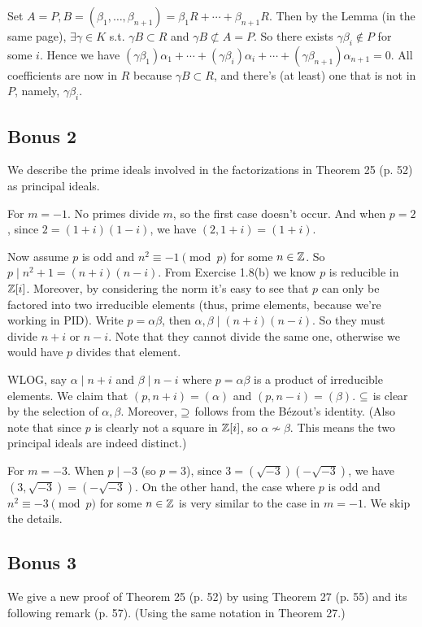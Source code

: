 \documentclass[../Marcus.tex]{subfiles}
\begin{document}
Set $A=P,B=(\beta_1,\ldots,\beta_{n+1})=\beta_1R+\cdots+\beta_{n+1}R$. Then by the Lemma (in the same page), $\exists \gamma\in K$ s.t. $\gamma B\subset R$ and $\gamma B\not\subset A=P$. So there exists $\gamma\beta_i\notin P$ for some $i$. Hence we have $(\gamma\beta_1)\alpha_1+\cdots+(\gamma\beta_i)\alpha_i+\cdots+(\gamma\beta_{n+1})\alpha_{n+1}=0$. All coefficients are now in $R$ because $\gamma B\subset R$, and there's (at least) one that is not in $P$, namely, $\gamma\beta_i$.

\subsection*{Bonus 2}

We describe the prime ideals involved in the factorizations in Theorem 25 (p. 52) as principal ideals.

For $m=-1$. No primes divide $m$, so the first case doesn't occur. And when $p=2$, since $2=(1+i)(1-i)$, we have $(2,1+i)=(1+i)$.

Now assume $p$ is odd and $n^2\equiv -1 \pmod{p}$ for some $n\in\mathbb{Z}$. So $p\mid n^2+1=(n+i)(n-i)$. From Exercise 1.8(b) we know $p$ is reducible in $\mathbb{Z}[i]$. Moreover, by considering the norm it's easy to see that $p$ can only be factored into two irreducible elements (thus, prime elements, because we're working in PID). Write $p=\alpha\beta$, then $\alpha,\beta\mid(n+i)(n-i)$. So they must divide $n+i$ or $n-i$. Note that they cannot divide the same one, otherwise we would have $p$ divides that element.

WLOG, say $\alpha\mid n+i$ and $\beta\mid n-i$ where $p=\alpha\beta$ is a product of irreducible elements. We claim that $(p,n+i)=(\alpha)$ and $(p,n-i)=(\beta)$. $\subseteq$ is clear by the selection of $\alpha,\beta$. Moreover, $\supseteq$ follows from the Bézout's identity. (Also note that since $p$ is clearly not a square in $\mathbb{Z}[i]$, so $\alpha\nsim\beta$. This means the two principal ideals are indeed distinct.)

For $m=-3$. When $p\mid -3$ (so $p=3$), since $3=(\sqrt{-3})(-\sqrt{-3})$, we have $(3,\sqrt{-3})=(-\sqrt{-3})$. On the other hand, the case where $p$ is odd and $n^2\equiv -3 \pmod{p}$ for some $n\in\mathbb{Z}$ is very similar to the case in $m=-1$. We skip the details.

\subsection*{Bonus 3}

We give a new proof of Theorem 25 (p. 52) by using Theorem 27 (p. 55) and its following remark (p. 57). (Using the same notation in Theorem 27.)
\end{document}
